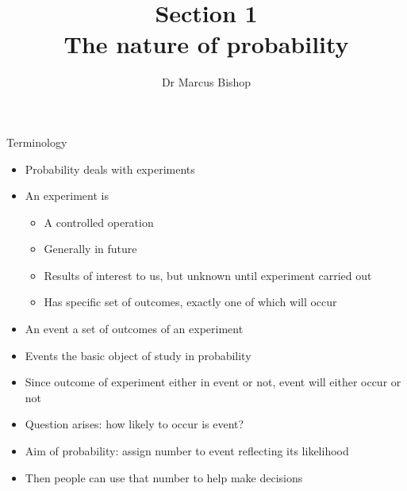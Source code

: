 \documentclass{beamer}
\title[\S1]{Section 1\\The nature of probability}
\author{Dr Marcus Bishop}
\theoremstyle{definition}
\begin{document}
\begin{frame}\titlepage\end{frame}
\LogoOff

\begin{frame}{Terminology}
\begin{itemize}
\item Probability deals with \alert{experiments}
\item An \alert{experiment} is
\begin{itemize}
\item A controlled operation
\item Generally in future
\item Results of interest to us, but unknown until experiment
carried out
\item Has specific set of \alert{outcomes}, exactly
one of which will occur
\end{itemize}
\item An \alert{event} a set of outcomes of an experiment
\item Events the basic object of study in probability
\item Since outcome of experiment either in event or not,
event will either occur or not
\item Question arises: how likely to occur is event?
\item Aim of probability: assign number to event
reflecting its likelihood
\item Then people can use that number to help make decisions
\end{itemize}
\end{frame}
\end{document}
